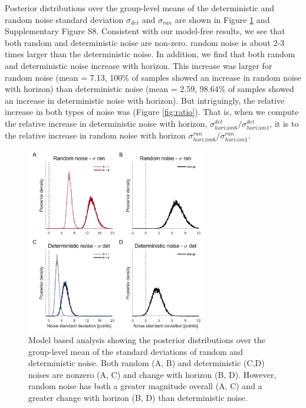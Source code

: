 \documentclass[12pt]{article}
\begin{document}
{Posterior distributions over the group-level means of the deterministic and random noise standard deviation $\sigma_{det}$ and $\sigma_{ran}$ are shown in Figure \ref{fig:mb1} and Supplementary Figure S8. Consistent with our model-free results, we see that both random and deterministic noise are non-zero.  random noise is about 2-3 times larger than the deterministic noise.  In addition, we find that both random and deterministic noise increase with horizon. This increase was larger for random noise (mean = 7.13, 100\% of samples showed an increase in random noise with horizon) than deterministic noise (mean = 2.59, 98.64\% of samples showed an increase in deterministic noise with horizon). But intriguingly, the relative increase in both types of noise was  (Figure \ref{fig:ratio}). That is, when we compute the relative increase in deterministic noise with horizon, $\sigma^{det}_{horizon6}/\sigma^{det}_{horizon1}$, it is  to the relative increase in random noise with horizon $\sigma^{ran}_{horizon6}/\sigma^{ran}_{horizon1}$. 

\begin{figure}[H]
\begin{center}
	\includegraphics[width=0.7\textwidth]{figures/RDBayes_hyperprior.jpg}
	\caption{Model based analysis showing the posterior distributions over the group-level mean of the standard deviations of  random and deterministic noise. Both random (A, B) and deterministic (C,D) noises are nonzero (A, C) and change with horizon (B, D).  However, random noise has both a greater magnitude overall (A, C) and a greater change with horizon (B, D) than deterministic noise.}
	\label{fig:mb1}
\end{center}
\end{figure}

}
\end{document}
